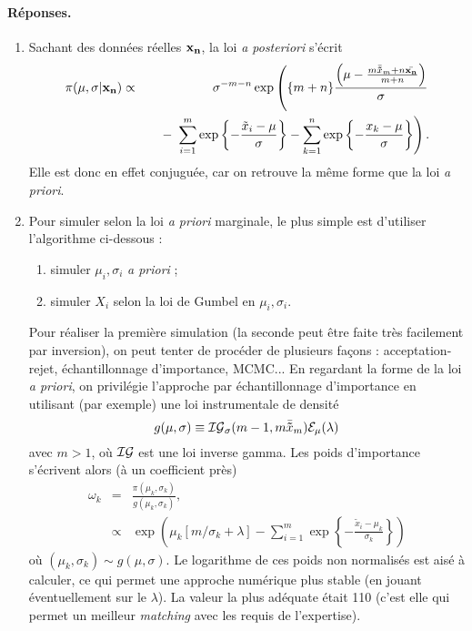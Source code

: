 \documentclass[10pt]{article}
\newcommand{\1}{\mathbbm{1}}
\begin{document}
\paragraph{\bf Réponses.}
\begin{enumerate}
\item Sachant des donn\'ees r\'eelles ${\bf x_n}$, la loi {\it a posteriori} s'\'ecrit
\begin{eqnarray*}
\pi(\mu,\sigma|{\bf x_n}) & \propto & {\displaystyle \sigma^{-m-n}\exp\left(\{m+n\}\frac{\left(\mu-\frac{m\bar{\bf\tilde{x}}_m + n\bar{\bf x_n}}{m+n}\right)}{\sigma} \right. }\\
& & {\displaystyle \ \ \ \left. - \ \sum\limits_{i=1}^{m} \exp\left\{-\frac{\tilde{x}_i-\mu}{\sigma}\right\}-\sum\limits_{k=1}^{n} \exp\left\{-\frac{x_k-\mu}{\sigma}\right\}\right).}
\end{eqnarray*}
Elle est donc en effet conjuguée, car on retrouve la même forme que la loi {\it a priori}. 
\item Pour simuler selon la loi {\it a priori} marginale, le plus simple est d'utiliser l'algorithme ci-dessous :
\begin{enumerate}
\item simuler $\mu_i,\sigma_i$ {\it a priori} ;
\item simuler $X_i$ selon la loi de Gumbel en  $\mu_i,\sigma_i$.
\end{enumerate}
Pour réaliser la première simulation (la seconde peut être faite très facilement par inversion), on peut tenter de procéder de plusieurs fa\c cons : acceptation-rejet, échantillonnage d'importance, MCMC... En regardant la forme de la loi {\it a priori}, on privilégie l'approche par échantillonnage d'importance en utilisant (par exemple) une loi instrumentale de densité
$$
g(\mu,\sigma) \equiv {\cal{IG}}_{\sigma}(m-1,m \bar{\bf\tilde{x}}_m) {\cal{E}}_{\mu}(\lambda)
$$
avec $m>1$, où ${\cal{IG}}$ est une loi inverse gamma. Les poids d'importance s'écrivent alors (à un coefficient près)
\begin{eqnarray*}
\omega_k & = & \frac{\pi(\mu_k,\sigma_k)}{g(\mu_k,\sigma_k)}, \\
& \propto & \exp\left(\mu_k\left[m/\sigma_k + \lambda\right] - \sum\limits_{i=1}^{m} \exp\left\{-\frac{\tilde{x}_i-\mu_k}{\sigma_k}\right\}\right)
\end{eqnarray*}
où  $(\mu_k,\sigma_k)\sim g(\mu,\sigma)$. Le logarithme de ces poids non normalisés est aisé à calculer, ce qui permet une approche numérique plus stable (en jouant éventuellement sur le $\lambda$).  La valeur la plus adéquate était 110 (c'est elle qui permet un meilleur {\it matching} avec les requis de l'expertise). 


\end{enumerate}
\end{document}
